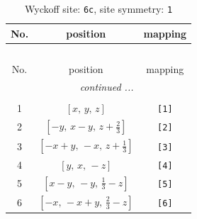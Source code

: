 \documentclass[fleqn,8pt]{jsarticle}
\begin{document}
\renewcommand{\arraystretch}{1.2}
\begin{longtable}{ccc}
\caption{Wyckoff site: {\tt 6c}, site symmetry: {\tt 1}}
 \\
 \hline \hline
No. & position & mapping \\ \hline \endfirsthead

\multicolumn{2}{l}{\tablename\ \thetable{}} \\
 \hline \hline
No. & position & mapping \\ \hline \endhead

 \hline \hline
\multicolumn{2}{r}{\footnotesize\it continued ...} \\ \endfoot

 \hline \hline
\multicolumn{2}{r}{} \\ \endlastfoot

1 & $\left[ x,\, y,\, z \right]$ & {\tt [1]} \\ \hline
2 & $\left[ - y,\, x - y,\, z + \frac{2}{3} \right]$ & {\tt [2]} \\ \hline
3 & $\left[ - x + y,\, - x,\, z + \frac{1}{3} \right]$ & {\tt [3]} \\ \hline
4 & $\left[ y,\, x,\, - z \right]$ & {\tt [4]} \\ \hline
5 & $\left[ x - y,\, - y,\, \frac{1}{3} - z \right]$ & {\tt [5]} \\ \hline
6 & $\left[ - x,\, - x + y,\, \frac{2}{3} - z \right]$ & {\tt [6]} \\
\end{longtable}
\end{document}
